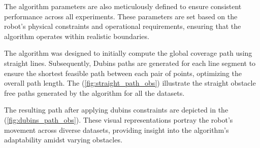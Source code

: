 The algorithm parameters are also meticulously defined to ensure consistent performance across all experiments. These parameters are set based on the robot's physical constraints and operational requirements, ensuring that the algorithm operates within realistic boundaries.

\vspace*{6mm} 

The algorithm was designed to initially compute the global coverage path using straight lines. Subsequently, Dubins paths are generated for each line segment to ensure the shortest feasible path between each pair of points, optimizing the overall path length. The (\autoref{fig:straight_path_obs}) illustrate the straight obstacle free paths generated by the algorithm for all the datasets.





\vspace*{6mm}

The resulting path after applying dubins constraints are depicted in the (\autoref{fig:dubins_path_obs}). These visual representations portray the robot's movement across diverse datasets, providing insight into the algorithm's adaptability amidst varying obstacles. 




